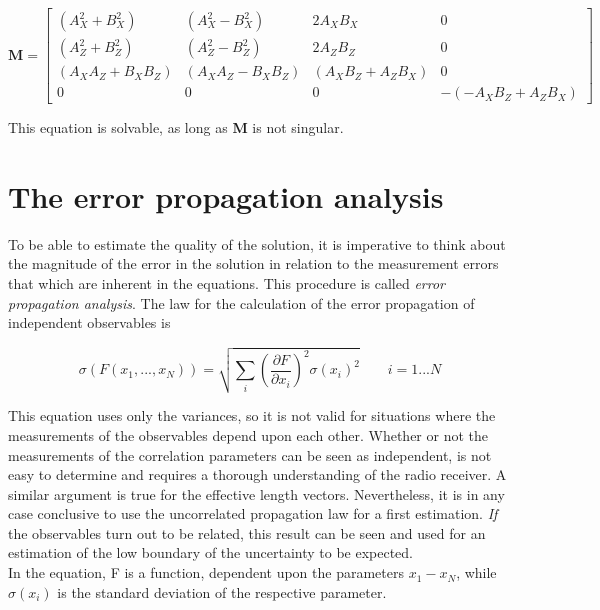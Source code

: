 \documentclass[a4paper,14pt]{extbook}
\begin{document}
\tiny
\begin{equation}
\textbf{M}= \left[
\begin{array}{cccc}
(A^2_X+ B^2_X) & (A^2_X- B^2_X) & 2 A_X B_X & 0 \\
(A^2_Z+ B^2_Z) &(A^2_Z- B^2_Z)  & 2 A_Z B_Z & 0 \\
 (A_X A_Z +  B_X B_Z)& (A_X A_Z - B_X B_Z) & (A_X B_Z + A_Z B_X) & 0 \\
0 & 0 & 0 & -(-A_X B_Z + A_Z B_X )
\end{array} \right]
\end{equation}
\normalsize

This equation is solvable, as long as \textbf{M} is not singular.

\section{The error propagation analysis}

To be able to estimate the quality of the solution, it is imperative to think about the magnitude of the error in the solution in relation to the measurement errors that which are inherent in the equations. This procedure is called \textit{error propagation analysis}. The law for the calculation of the error propagation of independent observables is

\begin{equation}
\sigma (F(x_1,...,x_N))= \sqrt{\sum_i (\frac{\partial F}{\partial x_i})^2 \sigma (x_i)^2} \qquad i=1...N
\end{equation}

This equation uses only the variances, so it is not valid for situations where the measurements of the observables depend upon each other. Whether or not the measurements of the correlation parameters can be seen as independent, is not easy to determine and requires a thorough understanding of the radio receiver. A similar argument is true for the effective length vectors. Nevertheless, it is in any case conclusive to use the uncorrelated propagation law for a first estimation. \textit{If} the observables turn out to be related, this result can be seen and used for an estimation of the low boundary of the uncertainty to be expected.\\

In the equation, F is a function, dependent upon the parameters $x_1 - x_N$, while $\sigma(x_i)$ is the standard deviation of the respective parameter.
\end{document}
